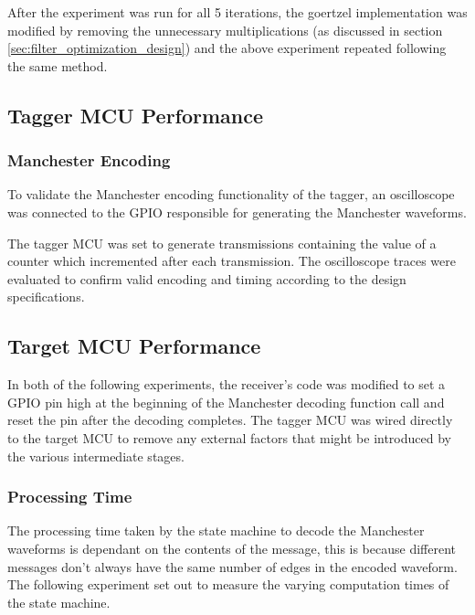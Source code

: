 After the experiment was run for all 5 iterations, the goertzel implementation was modified by removing the unnecessary multiplications (as discussed in section \ref{sec:filter_optimization_design}) and the above experiment repeated following the same method.







\subsection{Tagger MCU Performance}

\subsubsection{Manchester Encoding}
To validate the Manchester encoding functionality of the tagger, an oscilloscope was connected to the GPIO responsible for generating the Manchester waveforms.

The tagger MCU was set to generate transmissions containing the value of a counter which incremented after each transmission. The oscilloscope traces were evaluated to confirm valid encoding and timing according to the design specifications.




\subsection{Target MCU Performance}

In both of the following experiments, the receiver's code was modified to set a GPIO pin high at the beginning of the Manchester decoding function call and reset the pin after the decoding completes. The tagger MCU was wired directly to the target MCU to remove any external factors that might be introduced by the various intermediate stages.

\subsubsection{Processing Time}
The processing time taken by the state machine to decode the Manchester waveforms is dependant on the contents of the message, this is because different messages don't always have the same number of edges in the encoded waveform. The following experiment set out to measure the varying computation times of the state machine.

